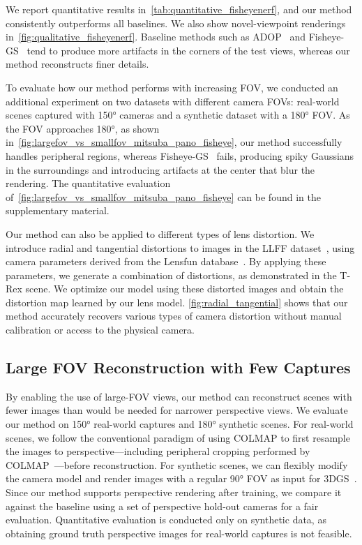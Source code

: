 We report quantitative results in~\cref{tab:quantitative_fisheyenerf}, and our method consistently outperforms all baselines. We also show novel-viewpoint renderings in~\cref{fig:qualitative_fisheyenerf}. Baseline methods such as ADOP~\cite{ruckert2022adop} and Fisheye-GS~\cite{liao2024fisheye} tend to produce more artifacts in the corners of the test views, whereas our method reconstructs finer details.

To evaluate how our method performs with increasing FOV, we conducted an additional experiment on two datasets with different camera FOVs: real-world scenes captured with 150\si{\degree} cameras and a synthetic dataset with a 180\si{\degree} FOV. As the FOV approaches 180\si{\degree}, as shown in~\cref{fig:largefov_vs_smallfov_mitsuba_pano_fisheye}, our method successfully handles peripheral regions, whereas Fisheye-GS~\cite{liao2024fisheye} fails, producing spiky Gaussians in the surroundings and introducing artifacts at the center that blur the rendering. The quantitative evaluation of~\cref{fig:largefov_vs_smallfov_mitsuba_pano_fisheye} can be found in the supplementary material.

Our method can also be applied to different types of lens distortion. We introduce radial and tangential distortions to images in the LLFF dataset~\cite{mildenhall2019llff}, using camera parameters derived from the Lensfun database~\cite{lensfun}. 
By applying these parameters, we generate a combination of distortions, as demonstrated in the T-Rex scene. 
We optimize our model using these distorted images and obtain the distortion map learned by our lens model.
\cref{fig:radial_tangential} shows that our method accurately recovers various types of camera distortion without manual calibration or access to the physical camera.



\subsection{Large FOV Reconstruction with Few Captures} 
\label{sec:eval_cubemap}
By enabling the use of large-FOV views, our method can reconstruct scenes with fewer images than would be needed for narrower perspective views.
We evaluate our method on 150\si{\degree} real-world captures and 180\si{\degree} synthetic scenes. For real-world scenes, we follow the conventional paradigm of using COLMAP to first resample the images to perspective—including peripheral cropping performed by COLMAP~\cite{schoenberger2016sfm}—before reconstruction. For synthetic scenes, we can flexibly modify the camera model and render images with a regular 90\si{\degree} FOV as input for 3DGS~\cite{kerbl20233d}. Since our method supports perspective rendering after training, we compare it against the baseline using a set of perspective hold-out cameras for a fair evaluation. Quantitative evaluation is conducted only on synthetic data, as obtaining ground truth perspective images for real-world captures is not feasible.


